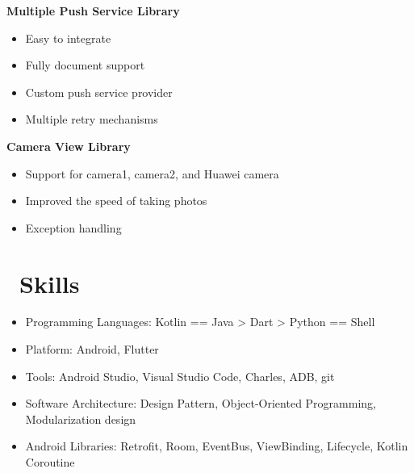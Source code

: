 \documentclass{resume}
\begin{document}
    \textbf{Multiple Push Service Library}
    \begin{itemize}
        \item Easy to integrate
        \item Fully document support
        \item Custom push service provider
        \item Multiple retry mechanisms
    \end{itemize}

    \textbf{Camera View Library}
    \begin{itemize}
        \item Support for camera1, camera2, and Huawei camera
        \item Improved the speed of taking photos
        \item Exception handling
    \end{itemize}



    \section{\faCogs\ Skills}
    \begin{itemize}[parsep=0.5ex]
        \item Programming Languages: Kotlin == Java > Dart > Python == Shell
        \item Platform: Android, Flutter
        \item Tools: Android Studio, Visual Studio Code, Charles, ADB, git
        \item Software Architecture: Design Pattern, Object-Oriented Programming, Modularization design
        \item Android Libraries: Retrofit, Room, EventBus, ViewBinding, Lifecycle, Kotlin Coroutine
    \end{itemize}



%
%
\end{document}
